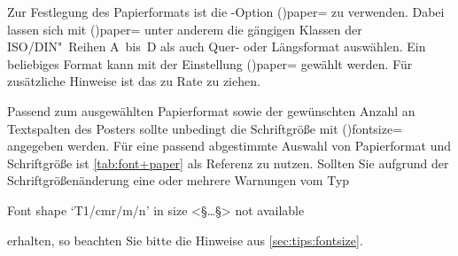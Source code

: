 \begin{DeclareEntity}{}
Zur Festlegung des Papierformats ist die \KOMAScript-Option 
\Option(){paper=\PMisc} zu verwenden. Dabei lassen 
sich mit \Option(){paper=} unter anderem 
die gängigen Klassen der ISO/DIN"~Reihen A~bis~D als auch Quer- oder 
Längsformat auswählen. Ein beliebiges Format kann mit der Einstellung
\Option(){paper=} gewählt werden. Für 
zusätzliche Hinweise ist das \scrguide zu Rate zu ziehen.

Passend zum ausgewählten Papierformat sowie der gewünschten Anzahl an 
Textspalten des Posters sollte unbedingt die Schriftgröße mit 
\Option(){fontsize=\PLength} angegeben werden. Für eine 
passend abgestimmte Auswahl von Papierformat und Schriftgröße ist 
\autoref{tab:font+paper} als Referenz zu nutzen. Sollten Sie aufgrund der 
Schriftgrößenänderung eine oder mehrere Warnungen vom Typ
%
\begin{quoting}
\begin{Code}
Font shape `T1/cmr/m/n' in size <§\dots§> not available
\end{Code}
\end{quoting}
%
erhalten, so beachten Sie bitte die Hinweise aus \autoref{sec:tips:fontsize}.



\end{DeclareEntity}
